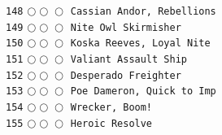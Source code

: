 \documentclass[a4paper,landscape]{article}
\begin{document}
\begin{multicols*}{5}
\texttt{148} \(\bigcirc\!\bigcirc\!\bigcirc\)  \texttt{Cassian Andor, Rebellions} \vspace{-0.3mm}\\ 
\texttt{149} \(\bigcirc\!\bigcirc\!\bigcirc\)  \texttt{Nite Owl Skirmisher} \vspace{-0.3mm}\\ 
\texttt{150} \(\bigcirc\!\bigcirc\!\bigcirc\)  \texttt{Koska Reeves, Loyal Nite } \vspace{-0.3mm}\\ 
\texttt{151} \(\bigcirc\!\bigcirc\!\bigcirc\)  \texttt{Valiant Assault Ship} \vspace{-0.3mm}\\ 
\texttt{152} \(\bigcirc\!\bigcirc\!\bigcirc\)  \texttt{Desperado Freighter} \vspace{-0.3mm}\\ 
\texttt{153} \(\bigcirc\!\bigcirc\!\bigcirc\)  \texttt{Poe Dameron, Quick to Imp} \vspace{-0.3mm}\\ 
\texttt{154} \(\bigcirc\!\bigcirc\!\bigcirc\)  \texttt{Wrecker, Boom!} \vspace{-0.3mm}\\ 
\texttt{155} \(\bigcirc\!\bigcirc\!\bigcirc\)  \texttt{Heroic Resolve} \vspace{-0.3mm}\\ 

\end{multicols*}
\end{document}
